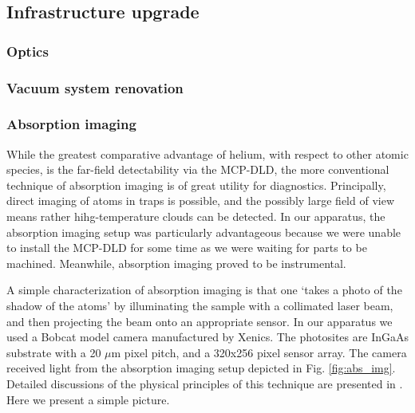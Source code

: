 \subsection*{Infrastructure upgrade}

\subsubsection{Optics}

\subsubsection{Vacuum system renovation}
\subsubsection*{Absorption imaging}

While the greatest comparative advantage of helium, with respect to other atomic species, is the far-field detectability via the MCP-DLD, the more conventional technique of absorption imaging is of great utility for diagnostics.
	Principally, direct imaging of atoms in traps is possible, and the possibly large field of view means rather hihg-temperature clouds can be detected.
	In our apparatus, the absorption imaging setup was particularly advantageous because we were unable to install the MCP-DLD for some time as we were waiting for parts to be machined.
	Meanwhile, absorption imaging proved to be instrumental.

A simple characterization of absorption imaging is that one `takes a photo of the shadow of the atoms' by illuminating the sample with a collimated laser beam, and then projecting the beam onto an appropriate sensor.
	In our apparatus we used a Bobcat model camera manufactured by Xenics.
	The photosites are InGaAs substrate with a 20 $\mu$m pixel pitch, and a 320x256 pixel sensor array.
	The camera received light from the absorption imaging setup depicted in Fig.
	\ref{fig:abs_img}.
	Detailed discussions of the physical principles of this technique are presented in \cite{MakingProbingUnderstanding,TychkovThesis}.
	Here we present a simple picture.

